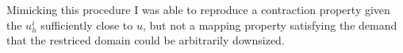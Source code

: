 Mimicking this procedure I was able to reproduce a contraction property given the $u_h^i$ sufficiently close to $u$, but not a mapping property satisfying the demand that the restriced domain could be arbitrarily downsized.



%

